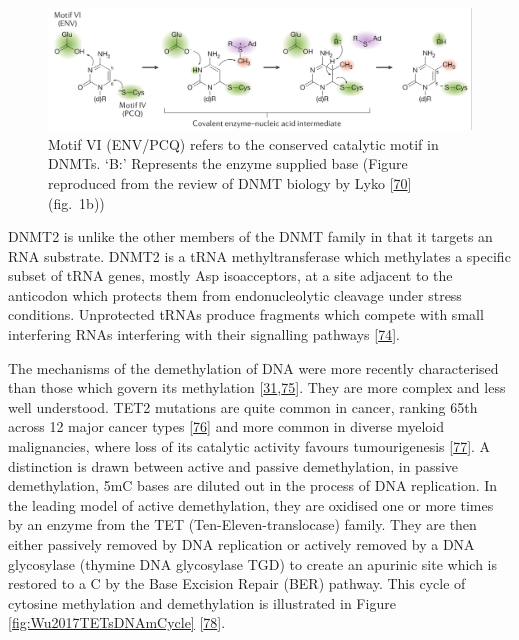 \documentclass[
]{book}
\begin{document}
\begin{figure}

{\centering \includegraphics[width=0.8\linewidth]{figs/Lyko2017DNAmMechanism} 

}

\caption{Motif VI (ENV/PCQ) refers to the conserved catalytic motif in DNMTs. `B:' Represents the enzyme supplied base (Figure reproduced from the review of DNMT biology by Lyko {[}\protect\hyperlink{ref-Lyko2017}{70}{]} (fig.~1b))}\label{fig:Lyko2017DNAmMechanism}
\end{figure}



DNMT2 is unlike the other members of the DNMT family in that it targets an RNA substrate.
DNMT2 is a tRNA methyltransferase which methylates a specific subset of tRNA genes, mostly Asp isoacceptors, at a site adjacent to the anticodon which protects them from endonucleolytic cleavage under stress conditions.
Unprotected tRNAs produce fragments which compete with small interfering RNAs interfering with their signalling pathways {[}\protect\hyperlink{ref-Kaiser2017}{74}{]}.

The mechanisms of the demethylation of DNA were more recently characterised than those which govern its methylation {[}\protect\hyperlink{ref-Ito2011}{31},\protect\hyperlink{ref-Tahiliani2009}{75}{]}.
They are more complex and less well understood.
TET2 mutations are quite common in cancer, ranking 65th across 12 major cancer types {[}\protect\hyperlink{ref-Kandoth2013}{76}{]} and more common in diverse myeloid malignancies, where loss of its catalytic activity favours tumourigenesis {[}\protect\hyperlink{ref-Ko2010a}{77}{]}.
A distinction is drawn between active and passive demethylation, in passive demethylation, 5mC bases are diluted out in the process of DNA replication.
In the leading model of active demethylation, they are oxidised one or more times by an enzyme from the TET (Ten-Eleven-translocase) family.
They are then either passively removed by DNA replication or actively removed by a DNA glycosylase (thymine DNA glycosylase TGD) to create an apurinic site which is restored to a C by the Base Excision Repair (BER) pathway. This cycle of cytosine methylation and demethylation is illustrated in Figure \ref{fig:Wu2017TETsDNAmCycle} {[}\protect\hyperlink{ref-Wu2017}{78}{]}.
\end{document}
